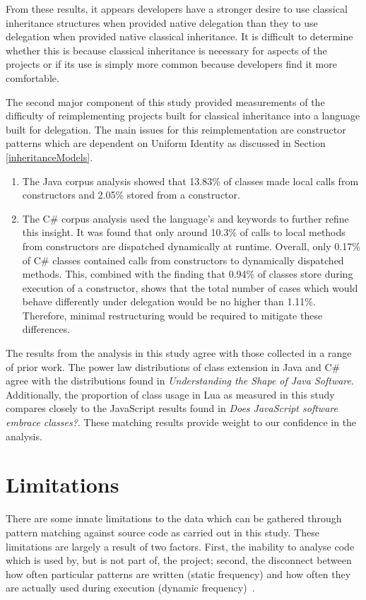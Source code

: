 From these results, it appears developers have a stronger desire to use classical inheritance structures when provided native delegation than they to use delegation when provided native classical inheritance. It is difficult to determine whether this is because classical inheritance is necessary for aspects of the projects or if its use is simply more common because developers find it more comfortable.
\newline

The second major component of this study provided measurements of the difficulty of reimplementing projects built for classical inheritance into a language built for delegation. The main issues for this reimplementation are constructor patterns which are dependent on Uniform Identity as discussed in Section \ref{inheritanceModels}. 
\begin{enumerate}
	\item The Java corpus analysis showed that 13.83\% of classes made local calls from constructors and 2.05\% stored  from a constructor.
	 
	\item The C\# corpus analysis used the language's  and  keywords to further refine this insight. It was found that only around 10.3\% of calls to local methods from constructors are dispatched dynamically at runtime. Overall, only 0.17\% of C\# classes contained calls from constructors to dynamically dispatched methods. This, combined with the finding that 0.94\% of classes store  during execution of a constructor, shows that the total number of cases which would behave differently under delegation would be no higher than 1.11\%. Therefore, minimal restructuring would be required to mitigate these differences.
\end{enumerate}

The results from the analysis in this study agree with those collected in a range of prior work. The power law distributions of class extension in Java and C\# agree with the distributions found in \textit{Understanding the Shape of Java Software}. Additionally, the proportion of class usage in Lua as measured in this study compares closely to the JavaScript results found in \textit{Does JavaScript software embrace classes?}. These matching results provide weight to our confidence in the analysis.

\section{Limitations}
There are some innate limitations to the data which can be gathered through pattern matching against source code as carried out in this study. These limitations are largely a result of two factors. First, the inability to analyse code which is used by, but is not part of, the project; second, the disconnect between how often particular patterns are written (static frequency) and how often they are actually used during execution (dynamic frequency)~\cite{StaticAnalysisLimits}.

